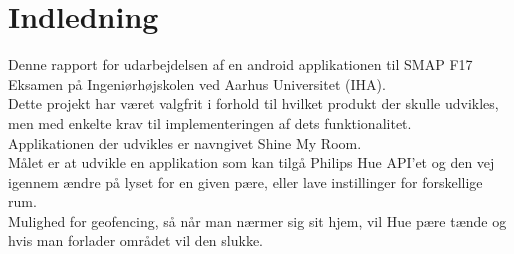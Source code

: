 \chapter{Indledning}
Denne rapport for udarbejdelsen af en android applikationen til SMAP F17 Eksamen på Ingeniørhøjskolen
ved Aarhus Universitet (IHA).\\
Dette projekt har været valgfrit i forhold til hvilket produkt der skulle udvikles, men med
enkelte krav til implementeringen af dets funktionalitet.\\
Applikationen der udvikles er navngivet Shine My Room.\\
\newline
Målet er at udvikle en applikation som kan tilgå Philips Hue API'et og den vej igennem ændre på lyset for en given pære, eller lave instillinger for forskellige rum. \\
Mulighed for geofencing, så når man nærmer sig sit hjem, vil Hue pære tænde og hvis man forlader området vil den slukke.
\newline